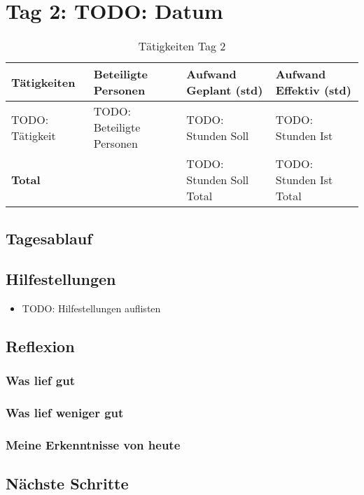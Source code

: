 \section{Tag 2: TODO: Datum}
\begin{table}[H]
    \begin{tabular}{|L{0.4\textwidth}|C{60pt}|C{60pt}|C{60pt}|}
        \hline
        \color{white}Tätigkeiten & \color{white}Beteiligte \color{white}Personen & \color{white}Aufwand Geplant (std) & \color{white}Aufwand Effektiv (std) \\
        \hline
        TODO: Tätigkeit & TODO: Beteiligte Personen & TODO: Stunden Soll & TODO: Stunden Ist \\
        \hline
        \textbf{Total} & & TODO: Stunden Soll Total & TODO: Stunden Ist Total \\
        \hline
    \end{tabular}
    \caption{Tätigkeiten Tag 2}
\end{table}

\subsection*{Tagesablauf}


\subsection*{Hilfestellungen}
\begin{itemize}
    \item TODO: Hilfestellungen auflisten
\end{itemize}

\subsection*{Reflexion}
\subsubsection*{Was lief gut}

\subsubsection*{Was lief weniger gut}

\subsubsection*{Meine Erkenntnisse von heute}

\subsection*{Nächste Schritte}

\pagebreak
